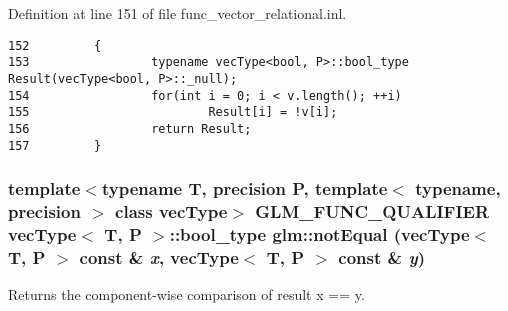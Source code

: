 Definition at line 151 of file func\_\-vector\_\-relational.inl.

\begin{Code}\begin{verbatim}152         {
153                 typename vecType<bool, P>::bool_type Result(vecType<bool, P>::_null);
154                 for(int i = 0; i < v.length(); ++i)
155                         Result[i] = !v[i];
156                 return Result;
157         }
\end{verbatim}
\end{Code}


\hypertarget{group__core__func__vector__relational_g520b77f15b84fffa9131cfa39db6c766}{
\subsubsection[notEqual]{\setlength{\rightskip}{0pt plus 5cm}template$<$typename T, precision P, template$<$ typename, precision $>$ class vecType$>$ GLM\_\-FUNC\_\-QUALIFIER vecType$<$ T, P $>$::bool\_\-type glm::notEqual (vecType$<$ T, P $>$ const \& {\em x}, \/  vecType$<$ T, P $>$ const \& {\em y})}}
\label{group__core__func__vector__relational_g520b77f15b84fffa9131cfa39db6c766}


Returns the component-wise comparison of result x == y.

